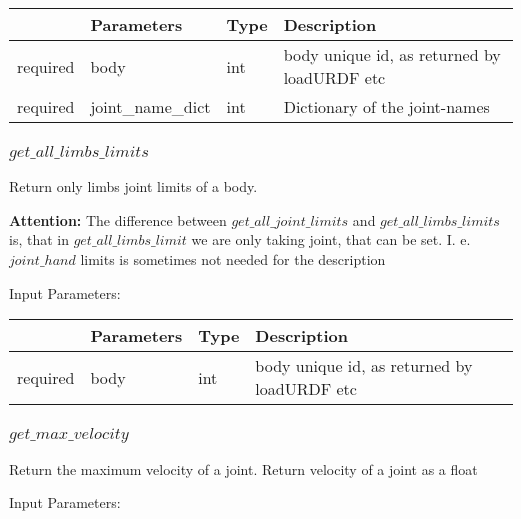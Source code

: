 \documentclass[
	ngerman,
	accentcolor=9c,%
	type=intern,
	marginpar=false
	]{tudapub}
\begin{document}
\begin{tabular}{|p{}|p{}|p{}| p{}|}
\hline
 & \textbf{Parameters} & \textbf{Type} & \textbf{Description} \\
\hline
required & body & int & body unique id, as returned by loadURDF etc\\
\hline
required & joint\_name\_dict & int & Dictionary of the joint-names\\
\hline
\end{tabular}
\vspace{0.5cm}

\subsubsection{$get\_all\_limbs\_limits$}
\noindent Return only limbs joint limits of a body.


\vspace{0.2cm}
\noindent \textbf{Attention: } The difference between $get\_all\_joint\_limits$ and $get\_all\_limbs\_limits$ is, that in
    $get\_all\_limbs\_limit$ we are only taking joint, that can be set. I. e. $joint\_hand$ limits is sometimes not needed
    for the description



\vspace{0.5cm}
\noindent Input Parameters:
\vspace{0.5cm}

\begin{tabular}{|p{}|p{}|p{}| p{}|}
\hline
 & \textbf{Parameters} & \textbf{Type} & \textbf{Description} \\
\hline
required & body & int & body unique id, as returned by loadURDF etc\\
\hline
\end{tabular}
\vspace{0.5cm}





\subsubsection{$get\_max\_velocity$}
\noindent Return the maximum velocity of a joint. Return velocity of a joint as a float



\vspace{0.5cm}
\noindent Input Parameters:
\vspace{0.5cm}
\end{document}
